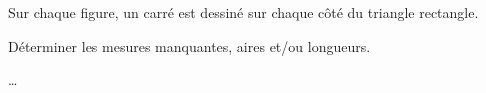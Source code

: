 \begin{exercice*}
    Sur chaque figure, un carré est dessiné sur chaque côté du triangle rectangle.

    Déterminer les mesures manquantes, aires et/ou longueurs.

    \hspace*{-17mm}
\end{exercice*}
\begin{corrige}
    \dots
\end{corrige}

